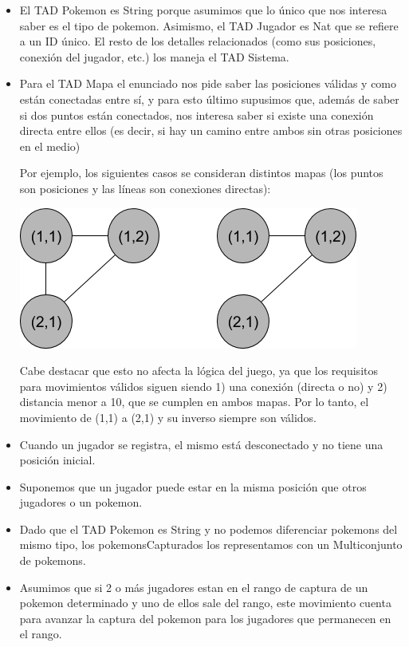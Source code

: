 \renewcommand{\labelitemi}{\textbullet}
\begin{itemize}

\item El TAD Pokemon es String porque asumimos que lo \'unico que nos interesa saber es el tipo de pokemon. Asimismo, el TAD Jugador es Nat que se refiere a un ID \'unico. El resto de los detalles relacionados (como sus posiciones, conexi\'on del jugador, etc.) los maneja el TAD Sistema.

\item Para el TAD Mapa el enunciado nos pide saber las posiciones v\'alidas y como est\'an conectadas entre s\'i, y para esto \'ultimo supusimos que, adem\'as de saber si dos puntos est\'an conectados, nos interesa saber si existe una conexi\'on directa entre ellos (es decir, si hay un camino entre ambos sin otras posiciones en el medio)

Por ejemplo, los siguientes casos se consideran distintos mapas (los puntos son posiciones y las l\'ineas son conexiones directas):

\bigskip
\centerline{\includegraphics[scale=0.5]{nodos-mapa.png}}

Cabe destacar que esto no afecta la l\'ogica del juego, ya que los requisitos para movimientos v\'alidos siguen siendo 1) una conexi\'on (directa o no) y 2) distancia menor a 10, que se cumplen en ambos mapas. Por lo tanto, el movimiento de (1,1) a (2,1) y su inverso siempre son v\'alidos.

\item Cuando un jugador se registra, el mismo est\'a desconectado y no tiene una posici\'on inicial.

\item Suponemos que un jugador puede estar en la misma posici\'on que otros jugadores o un pokemon.

\item Dado que el TAD Pokemon es String y no podemos diferenciar pokemons del mismo tipo, los pokemonsCapturados los representamos con un Multiconjunto de pokemons.

\item Asumimos que si 2 o m\'as jugadores estan en el rango de captura de un pokemon determinado y uno de ellos sale del rango, este movimiento cuenta para avanzar la captura del pokemon para los jugadores que permanecen en el rango.

\end{itemize}